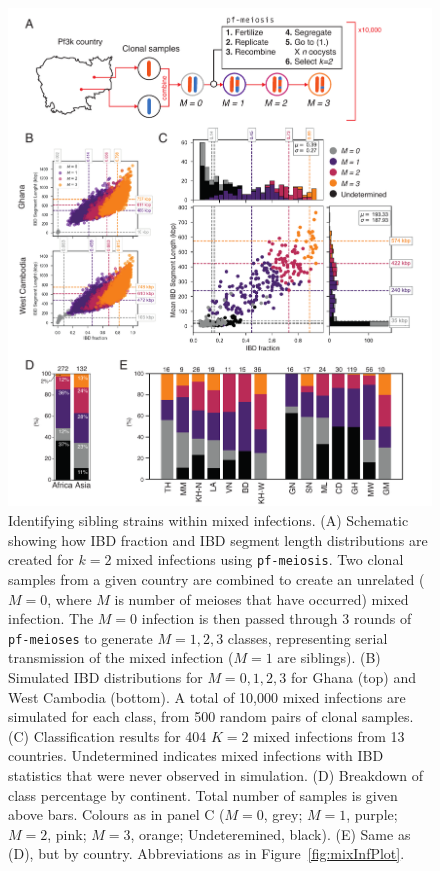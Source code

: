 \documentclass[9pt,lineno]{elife}
\begin{document}
\begin{figure}[htp]
  \begin{center}
  \includegraphics[width=\textwidth]{Fig4-v4.pdf}
   \caption{Identifying sibling strains within mixed infections.  (A) Schematic showing how IBD fraction and IBD segment length distributions are created for $k=2$ mixed infections using \texttt{pf-meiosis}. Two clonal samples from a given country are combined to create an unrelated ($M=0$, where $M$ is number of meioses that have occurred) mixed infection.  The $M=0$ infection is then passed through 3 rounds of \texttt{pf-meioses} to generate $M=1,2,3$ classes, representing serial transmission of the mixed infection ($M=1$ are siblings). (B) Simulated IBD distributions for $M=0,1,2,3$ for Ghana (top) and West Cambodia (bottom). A total of 10,000 mixed infections are simulated for each class, from 500 random pairs of clonal samples. (C) Classification results for 404 $K=2$ mixed infections from 13 countries. Undetermined indicates mixed infections with IBD statistics that were never observed in simulation. (D) Breakdown of class percentage by continent. Total number of samples is given above bars. Colours as in panel C ($M=0$, grey; $M=1$, purple; $M=2$, pink; $M=3$, orange; Undeteremined, black). (E) Same as (D), but by country. Abbreviations as in Figure~\ref{fig:mixInfPlot}.}
   \label{fig:classify}
   \end{center}
\end{figure}
\end{document}
